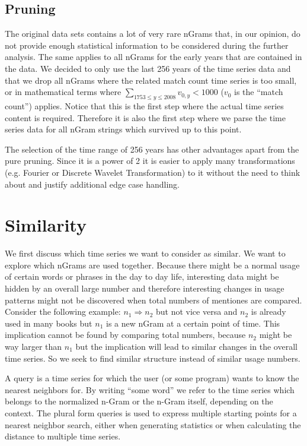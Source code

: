 \subsection{Pruning}
\label{ssec:baseline:data:prune}
The original data sets contains a lot of very rare nGrams that, in our opinion, do not provide enough statistical information to be considered during the further analysis. The same applies to all nGrams for the early years that are contained in the data. We decided to only use the last \num{256} years of the time series data and that we drop all nGrams where the related match count time series is too small, or in mathematical terms where $\sum_{1753 \leq y \leq 2008} v_{0, y} < 1000$ ($v_0$ is the \enquote{match count}) applies. Notice that this is the first step where the actual time series content is required. Therefore it is also the first step where we parse the time series data for all nGram strings which survived up to this point.

The selection of the time range of \num{256} years has other advantages apart from the pure pruning. Since it is a power of \num{2} it is easier to apply many transformations (e.g. Fourier or Discrete Wavelet Transformation) to it without the need to think about and justify additional edge case handling.



\section{Similarity}
\label{sec:baseline:sim}
We first discuss which time series we want to consider as similar. We want to explore which nGrams are used together. Because there might be a normal usage of certain words or phrases in the day to day life, interesting data might be hidden by an overall large number and therefore interesting changes in usage patterns might not be discovered when total numbers of mentiones are compared. Consider the following example: $n_1 \Rightarrow n_2$ but not vice versa and $n_2$ is already used in many books but $n_1$ is a new nGram at a certain point of time. This implication cannot be found by comparing total numbers, because $n_2$ might be way larger than $n_1$ but the implication will lead to similar changes in the overall time series. So we seek to find similar structure instead of similar usage numbers.

\begin{definition}[Query]
    A query is a time series for which the user (or some program) wants to know the nearest neighbors for. By writing \enquote{some word} we refer to the time series which belongs to the normalized n-Gram or the n-Gram itself, depending on the context. The plural form queries is used to express multiple starting points for a nearest neighbor search, either when generating statistics or when calculating the distance to multiple time series.
\end{definition}

